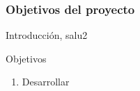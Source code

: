 \begin{frame}
    \frametitle{Objetivos del proyecto}
    Introducción, salu2
    \begin{block}{Objetivos}
        \begin{enumerate}
            \item Desarrollar 
        \end{enumerate}
    \end{block}

\end{frame}